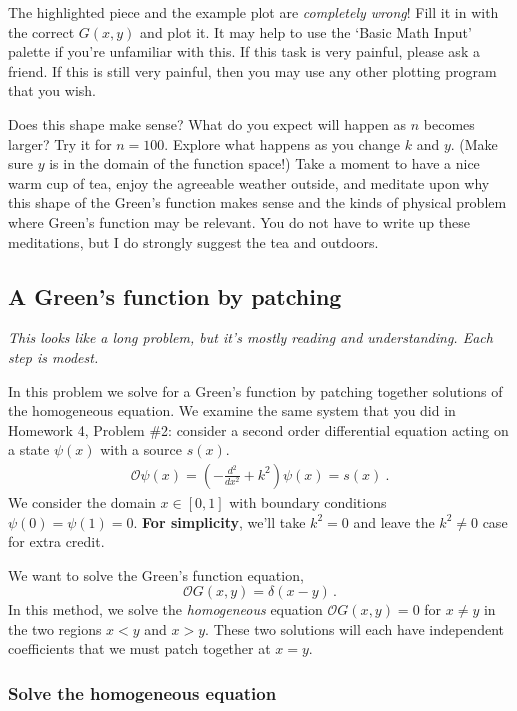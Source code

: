 \documentclass[12pt]{article}
\numberwithin{equation}{subsection}    %
\begin{document}
The highlighted piece and the example plot are \emph{completely wrong}! Fill it in with the correct $G(x,y)$ and plot it. It may help to use the `Basic Math Input' palette if you're unfamiliar with this. If this task is very painful, please ask a friend. If this is still very painful, then you may use any other plotting program that you wish. 

Does this shape make sense? What do you expect will happen as $n$ becomes larger? Try it for $n=100$. Explore what happens as you change $k$ and $y$. (Make sure $y$ is in the domain of the function space!) Take a moment to have a nice warm cup of tea, enjoy the agreeable weather outside, and meditate upon why this shape of the Green's function makes sense and the kinds of physical problem where Green's function may be relevant. You do not have to write up these meditations, but I do strongly suggest the tea and outdoors.  




\subsection{A Green's function by patching}

\emph{This looks like a long problem, but it's mostly reading and understanding. Each step is modest.}

In this problem we solve for a Green's function by patching together solutions of the homogeneous equation.  We examine the same system that you did in Homework 4, Problem \#2: consider a second order differential equation acting on a state $\psi(x)$ with a source $s(x)$. 
\begin{align*}
\mathcal O \psi(x) = 
	\left(-\frac{d^2}{dx^2} + k^2 \right) \psi(x) = s(x) \ .
\end{align*}
We consider the domain $x\in[0,1]$ with boundary conditions $\psi(0) = \psi(1) = 0$. \textbf{For simplicity}, we'll take $k^2 = 0$ and leave the $k^2 \neq 0$ case for extra credit.



We want to solve the Green's function equation, $$\mathcal O G(x,y) = \delta(x-y)\, .$$ In this method, we solve the \emph{homogeneous} equation $\mathcal O G(x,y) = 0$ for $x\neq y$ in the two regions $x<y$ and $x>y$. These two solutions will each have independent coefficients that we must patch together at $x=y$.

\subsubsection{Solve the homogeneous equation}
\end{document}
